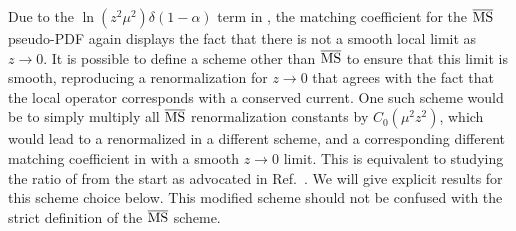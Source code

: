 \begin{widetext}
Due to the $\ln(z^2\mu^2)\delta(1-\alpha)$ term in , the matching coefficient for the $\overline{\rm MS}$ pseudo-PDF again displays the fact that there is not a smooth local limit as $z\to 0$.  It is possible to define a scheme other than $\overline{\rm MS}$ to ensure that this limit is smooth, reproducing a renormalization for $z\to 0$ that agrees with the fact that the local operator corresponds with a conserved current. One such scheme would be to simply multiply all $\overline{\rm MS}$ renormalization constants by $C_0(\mu^2 z^2)$, which would lead to a   \spcorr renormalized in a different scheme, and a corresponding different matching coefficient in  with a smooth $z\to 0$ limit. This is equivalent to studying the ratio of  from the start as advocated in Ref.~\cite{Radyushkin:2017cyf,Radyushkin:2017lvu}. We will give explicit results for this scheme choice below. This modified scheme should not be confused with the strict definition of the $\overline{\rm MS}$ scheme.



\end{widetext}
